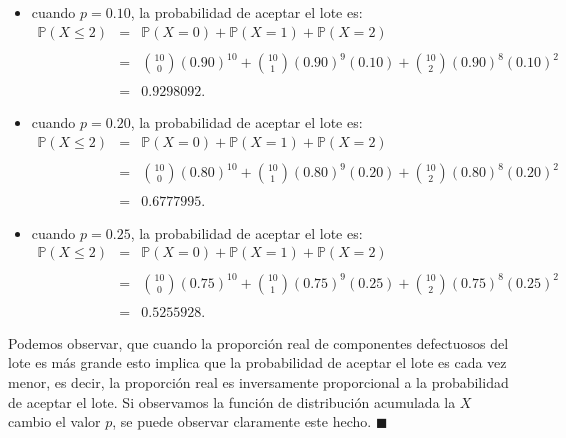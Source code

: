 \documentclass[11pt,letterpaper]{article}
\newcommand{\mP}{\mathbb{P}}
\begin{document}
\begin{itemize}
\begin{itemize}
\item cuando $p=0.10$, la probabilidad de aceptar el lote es: 
\begin{equation*}
\begin{array}{ccl}
\mP(X\leq 2)&=&\mP(X=0)+\mP(X=1)+\mP(X=2)\\
&& \\
&=&{10\choose0}(0.90)^{10}+{10\choose1}(0.90)^9(0.10)+{10\choose2}(0.90)^8(0.10)^2\\
&& \\
&=& 0.9298092.
\end{array}
\end{equation*}
\item cuando $p=0.20$, la probabilidad de aceptar el lote es: 
\begin{equation*}
\begin{array}{ccl}
\mP(X\leq 2)&=&\mP(X=0)+\mP(X=1)+\mP(X=2)\\
&& \\
&=&{10\choose0}(0.80)^{10}+{10\choose1}(0.80)^9(0.20)+{10\choose2}(0.80)^8(0.20)^2\\
&& \\
&=& 0.6777995.
\end{array}
\end{equation*}
\item cuando $p=0.25$, la probabilidad de aceptar el lote es: 
\begin{equation*}
\begin{array}{ccl}
\mP(X\leq 2)&=&\mP(X=0)+\mP(X=1)+\mP(X=2)\\
&& \\
&=&{10\choose0}(0.75)^{10}+{10\choose1}(0.75)^9(0.25)+{10\choose2}(0.75)^8(0.25)^2\\
&& \\
&=& 0.5255928.
\end{array}
\end{equation*}
\end{itemize}

Podemos observar, que cuando la proporción real de componentes defectuosos del lote es más grande esto implica que la probabilidad de aceptar el lote es cada vez menor, es decir, la proporción real es inversamente proporcional a la probabilidad de aceptar el lote. Si observamos la función de distribución acumulada la $X$ cambio el valor $p$, se puede observar claramente este hecho. $\blacksquare$
\end{itemize}
\end{document}
